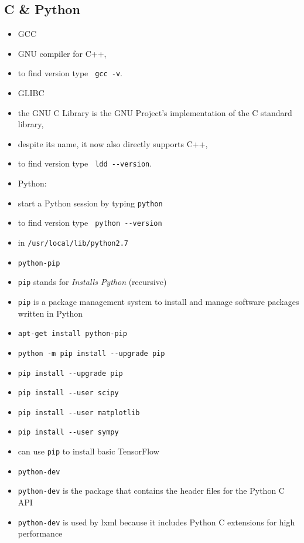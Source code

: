 \documentclass[twocolumn]{IEEEtran} %
\begin{document}
\subsection{C \& Python}
\begin{itemize}
    \item GCC
    \bi
        \item GNU compiler for C++,
        \item to find version  type \verb| gcc -v|.
    \ei
    \item GLIBC
    \bi
        \item the GNU C Library is the GNU Project's implementation of the C standard library,
        \item despite its name, it now also directly supports C++,
        \item to find version type \verb| ldd --version|.
    \ei
    \item Python:
    \bi
        \item start a Python session by typing \verb|python|
        \item to find version type \verb| python --version|
        \item in \verb|/usr/local/lib/python2.7|
    \ei
    \item \verb|python-pip|
    \bi
        \item \verb|pip| stands for \emph{Installs Python} (recursive)
        \item \verb|pip| is a package management system to install and manage software packages written in Python
        \item \verb|apt-get install python-pip|
        \item \verb|python -m pip install --upgrade pip|
        \item \verb|pip install --upgrade pip|
        \item \verb|pip install --user scipy|
        \item \verb|pip install --user matplotlib|
        \item \verb|pip install --user sympy|
        \item can use \verb|pip| to install basic TensorFlow
    \ei
    \item  \verb|python-dev|
    \bi
        \item \verb|python-dev| is the package that contains the header files for the Python C API
        \item \verb|python-dev| is used by lxml because it includes Python C extensions for high performance

\end{itemize}
\end{document}
